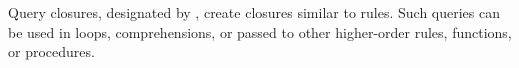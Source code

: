 \begin{prooftree}
\end{prooftree}

\begin{prooftree}
\end{prooftree}

Query closures, designated by , create closures similar to rules. Such queries
can be used in  loops, comprehensions, or passed to other higher-order rules,
functions, or procedures.

\begin{prooftree}
\end{prooftree}
